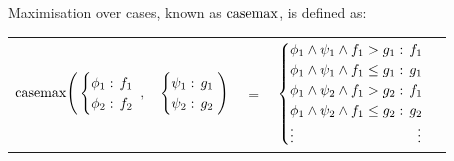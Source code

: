 Maximisation over cases, known as $\mathrm{casemax}$, is defined as:
\vspace{-0.5em}
{\footnotesize 
    \abovedisplayskip=0pt
    \belowdisplayskip=0pt
    \begin{center}
        \begin{tabular}{r c c c l}
            \hspace{-7mm} 
            
            $\mathrm{casemax} \Bigg(
            \begin{cases}
            \phi_1: \hspace{-1mm} & \hspace{-1mm} f_1 \\ 
            \phi_2: \hspace{-1mm} & \hspace{-1mm} f_2 \\ 
            \end{cases}$
            $,$
            &
            \hspace{-4mm}
            $\begin{cases}
            \psi_1: \hspace{-1mm} & \hspace{-1mm} g_1 \\ 
            \psi_2: \hspace{-1mm} & \hspace{-1mm} g_2 \\ 
            \end{cases} \Bigg)$
            &
            \hspace{-4mm} 
            $ = $
            &
            \hspace{-4mm}
            $\begin{cases}
            \phi_1 \wedge \psi_1 \wedge f_1 > g_1    : & \hspace{-2mm} f_1 \\ 
            \phi_1 \wedge \psi_1 \wedge f_1 \leq g_1 : & \hspace{-2mm} g_1 \\ 
            \phi_1 \wedge \psi_2 \wedge f_1 > g_2    : & \hspace{-2mm} f_1 \\ 
            \phi_1 \wedge \psi_2 \wedge f_1 \leq g_2 : & \hspace{-2mm} g_2 \\ 
            \vdots & \vdots
            \end{cases}$
        \end{tabular}
    \end{center}
}%

